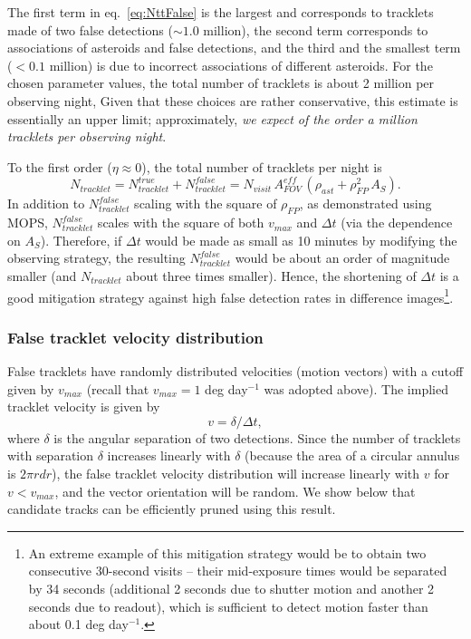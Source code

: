 The first term in eq.~\ref{eq:NttFalse} is the largest and corresponds to tracklets made of two false
detections ($\sim1.0$ million), the second term corresponds to associations of asteroids and false detections,
and the third and the smallest term ($<0.1$ million) is due to incorrect associations of different asteroids.
For the chosen parameter values, the total number of tracklets is about 2 million per observing night, Given that
these choices are rather conservative, this estimate is essentially an upper limit; approximately,
{\it we expect of the order a million tracklets per observing night}.

To the first order ($\eta \approx 0$), the total number of tracklets per night is
\begin{equation}
    N_{tracklet} =  N_{tracklet}^{true} + N_{tracklet}^{false} =
       N_{visit} \, A_{FOV}^{eff} \, \left(\rho_{ast}  + \rho^2_{FP}  \, A_S \right).
\end{equation}
In addition to $N_{tracklet}^{false}$ scaling with the square of $\rho_{FP}$, as demonstrated using MOPS,
$N_{tracklet}^{false}$ scales with the square of
both $v_{max}$ and  $\Delta t$ (via the dependence on $A_S$). Therefore, if $\Delta t$ would be made
as small as 10 minutes by modifying the observing strategy, the resulting $N_{tracklet}^{false}$ would be about an
order of magnitude smaller (and $N_{tracklet}$ about three times smaller).  Hence, the shortening of $\Delta t$ is
a good mitigation strategy against high false detection rates in difference images\footnote{An
extreme example of this mitigation strategy would be to obtain two consecutive 30-second visits -- their
mid-exposure times would be separated by 34 seconds (additional 2 seconds due to shutter motion and another
2 seconds due to readout), which is sufficient to detect motion faster than about 0.1 deg day$^{-1}$.}.


\subsubsection{False tracklet velocity distribution \label{sec:falsev}}

False tracklets have randomly distributed velocities (motion vectors) with a cutoff given by $v_{max}$
(recall that $v_{max} = 1$ deg day$^{-1}$ was adopted above). The implied tracklet velocity is given by
\begin{equation}
                       v =  \delta / \Delta t,
\end{equation}
where $\delta$ is the angular separation of two detections. Since the number of tracklets
with separation $\delta$ increases linearly with $\delta$ (because the area of a circular
annulus is $2\pi r dr$), the false tracklet velocity distribution will increase linearly with
$v$ for $v<v_{max}$, and the vector orientation will be random. We show below that candidate
tracks can be efficiently pruned using this result.



